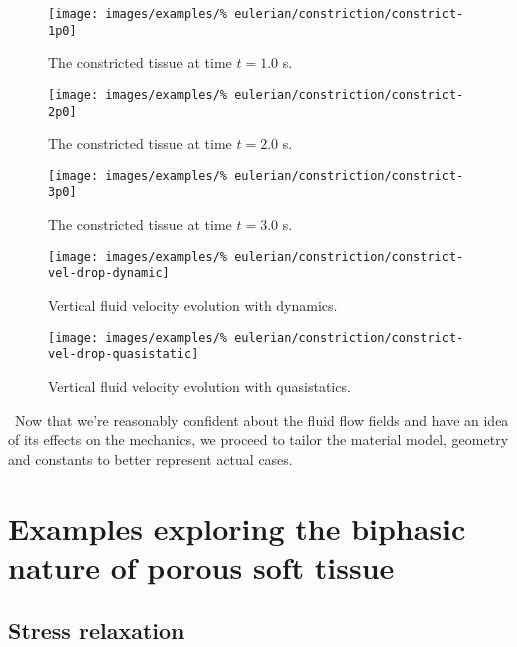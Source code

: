 \begin{figure}[!hptb]
\centering
\texttt{[image: images/examples/\%
eulerian/constriction/constrict-1p0]}
\caption{The constricted tissue at time $t=1.0$ s.} 
\label{constrict-image-1p0}
\end{figure}

\begin{figure}[!hptb]
\centering
\texttt{[image: images/examples/\%
eulerian/constriction/constrict-2p0]}
\caption{The constricted tissue at time $t=2.0$ s.} 
\label{constrict-image-2p0}
\end{figure}

\begin{figure}[!hptb]
\centering
\texttt{[image: images/examples/\%
eulerian/constriction/constrict-3p0]}
\caption{The constricted tissue at time $t=3.0$ s.} 
\label{constrict-image-3p0}
\end{figure}

\begin{figure}[!hptb]
\centering
\texttt{[image: images/examples/\%
eulerian/constriction/constrict-vel-drop-dynamic]}
\caption{Vertical fluid velocity evolution with dynamics.} 
\label{velocity-evolution-dynamic}
\end{figure}

\begin{figure}[!hptb]
\centering
\texttt{[image: images/examples/\%
eulerian/constriction/constrict-vel-drop-quasistatic]}
\caption{Vertical fluid velocity evolution with quasistatics.} 
\label{velocity-evolution-quasistatic}
\end{figure}

\clearpage

\textbullet\ Now that we're reasonably confident about the fluid flow
fields and have an idea of its effects on the mechanics, we proceed to
tailor the material model, geometry and constants to better represent
actual cases.

\section{Examples exploring the biphasic nature of porous soft tissue}
\label{biphasic-examples-2}

\subsection{Stress relaxation}
\label{stress-relaxation}

